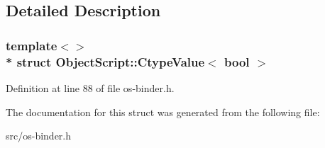 \subsection{Detailed Description}
\subsubsection*{template$<$$>$\\*
struct Object\+Script\+::\+Ctype\+Value$<$ bool $>$}



Definition at line 88 of file os-\/binder.\+h.



The documentation for this struct was generated from the following file\+:\begin{DoxyCompactItemize}
\item 
src/os-\/binder.\+h\end{DoxyCompactItemize}

